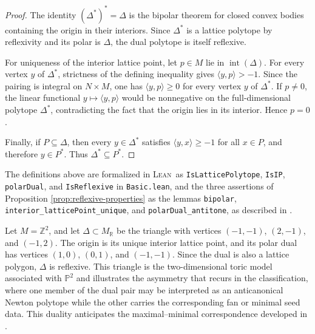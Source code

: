 \documentclass[appliedmath,article,submit,moreauthors]{Definitions/mdpi}
\newcommand{\Z}{\mathbb{Z}}
\newcommand{\RR}{\mathbb{R}}
\newcommand{\Lean}{\textsc{Lean}}
\newcommand{\interior}{\operatorname{int}}
\begin{document}
\begin{proof}
The identity \((\Delta^*)^*=\Delta\) is the bipolar theorem for closed convex
bodies containing the origin in their interiors. Since \(\Delta^*\) is a lattice
polytope by reflexivity and its polar is \(\Delta\), the dual polytope is itself
reflexive.

For uniqueness of the interior lattice point, let \(p\in M\) lie in
\(\interior(\Delta)\). For every vertex \(y\) of \(\Delta^*\), strictness of the
defining inequality gives \(\langle y,p\rangle>-1\). Since the pairing is
integral on \(N\times M\), one has \(\langle y,p\rangle\geq0\) for every vertex
\(y\) of \(\Delta^*\). If \(p\neq0\), the linear functional \(y\mapsto\langle
y,p\rangle\) would be nonnegative on the full-dimensional polytope \(\Delta^*\),
contradicting the fact that the origin lies in its interior. Hence \(p=0\).

Finally, if \(P\subseteq\Delta\), then every \(y\in\Delta^*\) satisfies
\(\langle y,x\rangle\geq-1\) for all \(x\in P\), and therefore \(y\in P^*\).
Thus \(\Delta^*\subseteq P^*\).
\end{proof}

The definitions above are formalized in \Lean\ as \nolinkurl{IsLatticePolytope},
\nolinkurl{IsIP}, \nolinkurl{polarDual}, and \nolinkurl{IsReflexive} in
\nolinkurl{Basic.lean}, and the three assertions of
Proposition \ref{prop:reflexive-properties} as the lemmas \nolinkurl{bipolar},
\nolinkurl{interior\_latticePoint\_unique}, and \nolinkurl{polarDual\_antitone},
as described in .

\begin{Example}
\label{ex:p2}
Let \(M=\Z^2\), and let \(\Delta\subset M_{\RR}\) be the triangle with vertices
\((-1,-1)\), \((2,-1)\), and \((-1,2)\). The origin is its unique interior
lattice point, and its polar dual has vertices \((1,0)\), \((0,1)\), and
\((-1,-1)\). Since the dual is also a lattice polygon, \(\Delta\) is reflexive.
This triangle is the two-dimensional toric model associated with
\(\mathbb{P}^2\) and illustrates the asymmetry that recurs in the
classification, where one member of the dual pair may be interpreted as an
anticanonical Newton polytope while the other carries the corresponding fan or
minimal seed data. This duality anticipates the maximal--minimal correspondence
developed in .
\end{Example}
\end{document}
